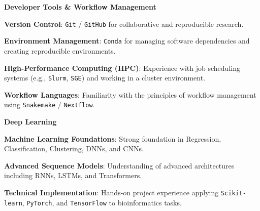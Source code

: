 \documentclass[11pt, a4paper]{awesome-cv}
\begin{document}
\begin{cvparagraph}
\vspace{4mm}
\textbf{Developer Tools \& Workflow Management}
\vspace{4.5mm}
\begin{cvitems}
  \item \textbf{Version Control}: \texttt{Git} / \texttt{GitHub} for collaborative and reproducible research.
  \item \textbf{Environment Management}: \texttt{Conda} for managing software dependencies and creating reproducible environments.
  \item \textbf{High-Performance Computing (HPC)}: Experience with job scheduling systems (e.g., \texttt{Slurm}, \texttt{SGE}) and working in a cluster environment.
  \item \textbf{Workflow Languages}: Familiarity with the principles of workflow management using \texttt{Snakemake} / \texttt{Nextflow}.
\end{cvitems}

\vspace{4mm}
\textbf{Deep Learning}
\vspace{4.5mm}
\begin{cvitems}
  \item \textbf{Machine Learning Foundations}: Strong foundation in Regression, Classification, Clustering, DNNs, and CNNs.
  \item \textbf{Advanced Sequence Models}: Understanding of advanced architectures including RNNs, LSTMs, and Transformers.
  \item \textbf{Technical Implementation}: Hands-on project experience applying \texttt{Scikit-learn}, \texttt{PyTorch}, and \texttt{TensorFlow} to bioinformatics tasks.
\end{cvitems}
\end{cvparagraph}

\end{document}
